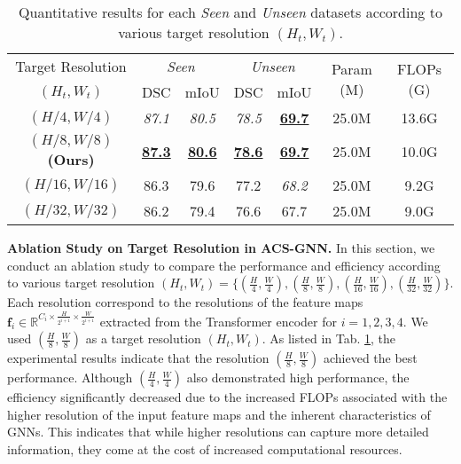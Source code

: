 \begin{table}[t]
    \centering
    \scriptsize
    \setlength\tabcolsep{4.0pt} %
    \begin{tabular}{c|cc|cc|c|c}
    \hline
    Target Resolution & \multicolumn{2}{c|}{\textit{Seen}}  & \multicolumn{2}{c|}{\textit{Unseen}} & \multicolumn{1}{c|}{\multirow{2}{*}{Param (M)}}  & \multicolumn{1}{c}{\multirow{2}{*}{FLOPs (G)}} \\ \cline{2-5}
    $(H_{t}, W_{t})$  & DSC & mIoU & DSC & mIoU & & \\ 
    \hline
    $(H / 4, W / 4)$                 & \textit{87.1} & \textit{80.5} & \textit{78.5} & \textbf{\underline{69.7}} & 25.0M & 13.6G \\
    $(H / 8, W / 8)$ \textbf{(Ours)} & \textbf{\underline{87.3}} & \textbf{\underline{80.6}} & \textbf{\underline{78.6}} & \textbf{\underline{69.7}} & 25.0M & 10.0G \\
    $(H / 16, W / 16)$               & 86.3 & 79.6 & 77.2 & \textit{68.2} & 25.0M & 9.2G \\
    $(H / 32, W / 32)$               & 86.2 & 79.4 & 76.6 & 67.7 & 25.0M & 9.0G \\
    \hline
    \end{tabular}
    \caption{Quantitative results for each \textit{Seen} and \textit{Unseen} datasets according to various target resolution $(H_{t}, W_{t})$.} \vspace{-0.25cm}
    \label{tab:ablation_target_resolution}
\end{table}

\noindent \textbf{Ablation Study on Target Resolution in ACS-GNN.} In this section, we conduct an ablation study to compare the performance and efficiency according to various target resolution $(H_{t}, W_{t}) = \{ (\frac{H}{4}, \frac{W}{4}), (\frac{H}{8}, \frac{W}{8}), (\frac{H}{16}, \frac{W}{16}), (\frac{H}{32}, \frac{W}{32}) \}$. Each resolution correspond to the resolutions of the feature maps $\mathbf{f}_{i} \in \mathbb{R}^{C_{i} \times \frac{H}{2^{i + 1}} \times \frac{W}{2^{i + 1}}}$ extracted from the Transformer encoder for $i = 1, 2, 3, 4$. We used $(\frac{H}{8}, \frac{W}{8})$ as a target resolution $(H_{t}, W_{t})$. As listed in Tab. \ref{tab:ablation_target_resolution}, the experimental results indicate that the resolution $(\frac{H}{8}, \frac{W}{8})$ achieved the best performance. Although $(\frac{H}{4}, \frac{W}{4})$ also demonstrated high performance, the efficiency significantly decreased due to the increased FLOPs associated with the higher resolution of the input feature maps and the inherent characteristics of GNNs. This indicates that while higher resolutions can capture more detailed information, they come at the cost of increased computational resources. 